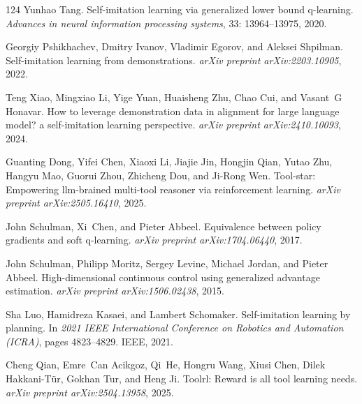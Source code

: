 \documentclass[]{youtu} %
\begin{document}
\begin{thebibliography}{124}
Yunhao Tang.
\newblock Self-imitation learning via generalized lower bound q-learning.
\newblock \emph{Advances in neural information processing systems}, 33: 13964--13975, 2020.

Georgiy Pshikhachev, Dmitry Ivanov, Vladimir Egorov, and Aleksei Shpilman.
\newblock Self-imitation learning from demonstrations.
\newblock \emph{arXiv preprint arXiv:2203.10905}, 2022.

Teng Xiao, Mingxiao Li, Yige Yuan, Huaisheng Zhu, Chao Cui, and Vasant~G Honavar.
\newblock How to leverage demonstration data in alignment for large language model? a self-imitation learning perspective.
\newblock \emph{arXiv preprint arXiv:2410.10093}, 2024.

Guanting Dong, Yifei Chen, Xiaoxi Li, Jiajie Jin, Hongjin Qian, Yutao Zhu, Hangyu Mao, Guorui Zhou, Zhicheng Dou, and Ji-Rong Wen.
\newblock Tool-star: Empowering llm-brained multi-tool reasoner via reinforcement learning.
\newblock \emph{arXiv preprint arXiv:2505.16410}, 2025{}.

John Schulman, Xi~Chen, and Pieter Abbeel.
\newblock Equivalence between policy gradients and soft q-learning.
\newblock \emph{arXiv preprint arXiv:1704.06440}, 2017{}.

John Schulman, Philipp Moritz, Sergey Levine, Michael Jordan, and Pieter Abbeel.
\newblock High-dimensional continuous control using generalized advantage estimation.
\newblock \emph{arXiv preprint arXiv:1506.02438}, 2015.

Sha Luo, Hamidreza Kasaei, and Lambert Schomaker.
\newblock Self-imitation learning by planning.
\newblock In \emph{2021 IEEE International Conference on Robotics and Automation (ICRA)}, pages 4823--4829. IEEE, 2021.

Cheng Qian, Emre~Can Acikgoz, Qi~He, Hongru Wang, Xiusi Chen, Dilek Hakkani-T{\"u}r, Gokhan Tur, and Heng Ji.
\newblock Toolrl: Reward is all tool learning needs.
\newblock \emph{arXiv preprint arXiv:2504.13958}, 2025.


\end{thebibliography}
\end{document}
